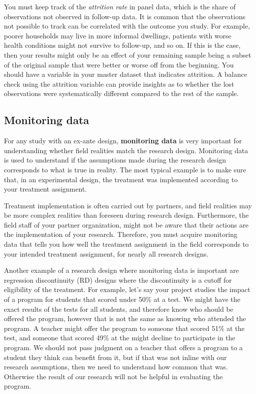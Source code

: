 You must keep track of the \textit{attrition rate} in panel data,
which is the share of observations not observed in follow-up data.
It is common that the observations not possible to track
can be correlated with the outcome you study.
For example, poorer households may live in more informal dwellings,
patients with worse health conditions might not survive to follow-up,
and so on.
If this is the case, then your results might only be an effect of your remaining sample
being a subset of the original sample that were better or worse off from the beginning.
You should have a variable in your master dataset that indicates attrition.
A balance check using the attrition variable can provide insights
as to whether the lost observations were systematically different
compared to the rest of the sample.

\subsection{Monitoring data}

For any study with an ex-ante design, 
\textbf{monitoring data}
is very important for understanding whether field realities match the research design.
Monitoring data is used to understand if the
assumptions made during the research design corresponds to what is true in reality.
The most typical example is to make sure that, in an experimental design,
the treatment was implemented according to your treatment assignment.

Treatment implementation is often carried out by partners,
and field realities may be more complex realities than foreseen during research design.
Furthermore, the field staff of your partner organization,
might not be aware that their actions are the implementation of your research.
Therefore, you must acquire monitoring data that tells you how well the treatment assignment in the field
corresponds to your intended treatment assignment,
for nearly all research designs.

Another example of a research design where monitoring data is important
are regression discontinuity (RD) designs
where the discontinuity is a cutoff for eligibility of the treatment. 
For example, 
let's say your project studies the impact of a program for students that scored under 50\% at a test.
We might have the exact results of the tests for all students, 
and therefore know who should be offered the program, 
however that is not the same as knowing who attended the program. 
A teacher might offer the program to someone that scored 51\% at the test,
and someone that scored 49\% at the might decline to participate in the program.
We should not pass judgment on a teacher that offers a program to a student
they think can benefit from it, 
but if that was not inline with our research assumptions,
then we need to understand how common that was.
Otherwise the result of our research will not be helpful
in evaluating the program.

